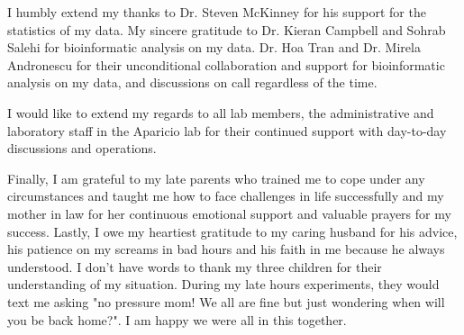 I humbly extend my thanks to Dr. Steven McKinney for his support for the statistics of my data. My sincere gratitude to Dr. Kieran Campbell and Sohrab Salehi for bioinformatic analysis on my data. Dr. Hoa Tran and Dr. Mirela Andronescu for their unconditional collaboration and support for bioinformatic analysis on my data, and discussions on call regardless of the time.  

I would like to extend my regards to all lab members, the administrative and laboratory staff in the Aparicio lab for their continued support with day-to-day discussions and operations.

Finally, I am grateful to my late parents who trained me to cope under any circumstances and taught me how to face challenges in life successfully and my mother in law for her continuous emotional support and valuable prayers for my success. Lastly, I owe my heartiest gratitude to my caring husband for his advice, his patience on my screams in bad hours and his faith in me because he always understood. I don't have words to thank my three children for their understanding of my situation. During my late hours experiments, they would text me asking "no pressure mom! We all are fine but just wondering when will you be back home?". I am happy we were all in this together.